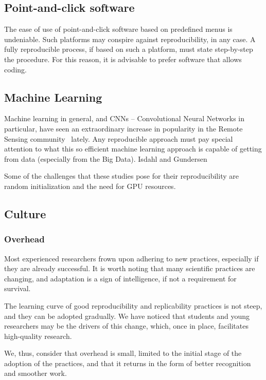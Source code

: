 \documentclass[journal,twoside]{IEEEtran}
\begin{document}
\subsection{Point-and-click software}

The ease of use of point-and-click software based on predefined menus is undeniable.
Such platforms may conspire against reproducibility, in any case.
A fully reproducible process, if based on such a platform, must state step-by-step the procedure.
For this reason, it is advisable to prefer software that allows coding.

\subsection{Machine Learning}

Machine learning in general, and CNNs -- Convolutional Neural Networks in particular, have seen an extraordinary increase in popularity in the Remote Sensing community~\cite{DeepLearningandProcessUnderstandingforDataDrivenEarthSystemScience} lately. 
Any reproducible approach must pay special attention to what this so efficient machine learning approach is capable of getting from data (especially from the Big Data).
Isdahl and Gundersen~\cite{OutoftheBoxReproducibilityaSurveyofMachineLearningPlatforms}

Some of the challenges that these studies pose for their reproducibility are random initialization and the need for GPU resources. 

\subsection{Culture}

\subsubsection{Overhead}

Most experienced researchers frown upon adhering to new practices, especially if they are already successful.
It is worth noting that many scientific practices are changing, and adaptation is a sign of intelligence, if not a requirement for survival.

The learning curve of good reproducibility and replicability practices is not steep, and they can be adopted gradually.
We have noticed that students and young researchers may be the drivers of this change, which, once in place, facilitates high-quality research.

We, thus, consider that overhead is small, limited to the initial stage of the adoption of the practices, and that it returns in the form of better recognition and smoother work.
\end{document}
